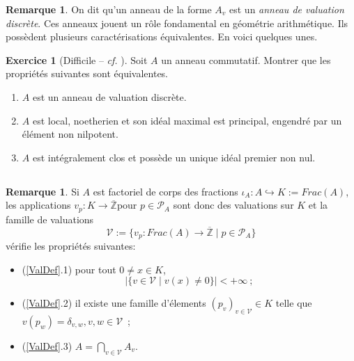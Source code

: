 \documentclass[a4paper, oneside, 12pt]{book}
\theoremstyle{definition} %
\newtheorem{remarque}[theoreme]{Remarque}
\newtheorem{exercice}[theoreme]{Exercice}
\newcommand{\Z}{\mathbb{Z}}
\begin{document}
\begin{remarque}
On dit qu'un anneau de la forme $A_v$ est un \textit{anneau de valuation discrète}. Ces anneaux jouent un rôle fondamental en géométrie arithmétique. Ils possèdent plusieurs caractérisations équivalentes. En voici quelques unes.
\end{remarque}

\begin{exercice}[{Difficile -- \textit{cf.} \cite[I,\S~2]{CL}}] %
  Soit $A$ un anneau commutatif. Montrer que les propriétés suivantes sont équivalentes.
  \begin{enumerate}
  \item $A$ est un anneau de valuation discrète. 
  \item $A$ est local, noetherien et son idéal maximal est principal, engendré par un élément non nilpotent.
  \item $A$ est intégralement clos et possède un unique idéal premier non nul.\\
  \end{enumerate}  
\end{exercice}



\subsection{}
\begin{remarque}
  Si $A$ est factoriel de corps des fractions $\iota_A:A\hookrightarrow K:=Frac(A)$, les applications $v_p:K\rightarrow \overline{\Z}$pour $p\in\mathcal{P}_A$ sont donc des valuations sur $K$ et la famille de valuations
  $$\mathcal{V}:=\{v_p:Frac(A)\rightarrow \overline{\Z}\; |\; p\in\mathcal{P}_A\}$$
  vérifie les propriétés suivantes:
  \begin{itemize}
  \item (\ref{ValDef}.1) pour tout $0\not=x\in K$, $$|\{v\in\mathcal{V} \;|\; v (x)\not=0\}|<+\infty~;$$
  \item (\ref{ValDef}.2) il existe une famille d'élements $(p_v)_{v\in\mathcal{V}}\in K$ telle que $v(p_w)=\delta_{v,w}, v,w\in\mathcal{V}$~;
  \item (\ref{ValDef}.3) $A=\displaystyle{\bigcap_{v\in\mathcal{V}}}A_v$.
  \end{itemize}
\end{remarque}
\end{document}
